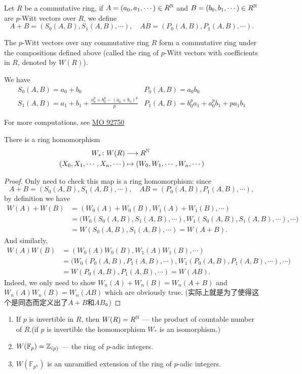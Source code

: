 Let $R$ be a commutative ring, if $A=(a_0,a_1,\cdots)\in R^{\mathbb{N}}$ and $B=(b_0,b_1,\cdots)\in R^{\mathbb{N}}$ are $p$-Witt vectors over $R$, we define
\[A+B=(S_0(A,B),  S_1(A,B),\cdots),\quad AB=(P_0(A,B),  P_1(A,B),\cdots).\]
\begin{theorem}
The $p$-Witt vectors over any commutative ring $R$ form a commutative ring under the compositions defined above (called the ring of $p$-Witt vectors with coefficients in $R$, denoted by $W(R)$).
\end{theorem}
\begin{example}
We have
\[
\begin{array}{cc}
	S_0(A,B) =a_0+b_0	& P_0(A,B)=a_0b_0\\
	S_1(A,B) =a_1+b_1+\frac{a_0^p+b_0^p-(a_0+b_0)^p}{p}	& P_1(A,B)=b_0^pa_1+a_0^pb_1+pa_1b_1
	\end{array}
\]

For more computations, see \href{http://mathoverflow.net/questions/92750/polynomials-for-addition-in-the-witt-vectors/93047#93047}{MO 92750}
\end{example}
\begin{theorem}
There is a ring homomorphism
\begin{align*}
W_*\colon W(R) &\longrightarrow R^{\mathbb{N}} \\
(X_0,X_1,\cdots,X_n,\cdots)&  \mapsto (W_0,W_1,\cdots,W_n,\cdots)
\end{align*}
\end{theorem}
\begin{proof}
Only need to check this map is a ring homomorphism: since
\[A+B=(S_0(A,B),S_1(A,B),\cdots ),\quad AB=(P_0(A,B),P_1(A,B),\cdots ),\]
by definition we have
\begin{align*}
W(A)+W(B)&=(W_0(A)+W_0(B),W_1(A)+W_1(B),\cdots)\\
&=\big(W_0(S_0(A,B),S_1(A,B),\cdots ),W_1(S_0(A,B),S_1(A,B),\cdots ),\cdots\big)\\
&=W(S_0(A,B),S_1(A,B),\cdots )=W(A+B).
\end{align*}
And similarly,
\begin{align*}
W(A)W(B)&=(W_0(A)W_0(B),W_1(A)W_1(B),\cdots)\\
& =\big(W_0(P_0(A,B),P_1(A,B),\cdots ),W_1(P_0(A,B),P_1(A,B),\cdots ),\cdots\big)\\
& =W(P_0(A,B),P_1(A,B),\cdots )=W(AB).
\end{align*}
Indeed, we only need to show $W_n(A)+W_n(B)=W_n(A+B)$ and $W_n(A)W_n(B)=W_n(AB)$ which are obviously true. (实际上就是为了使得这个是同态而定义出了$A+B$和$AB$。)
\end{proof}
\begin{example}
	\begin{enumerate}
		\item If $p$ is invertible in $R$, then $W(R)=R^{\mathbb{N}}$ --- the product of countable number of $R$.(if $p$ is invertible the homomorphism $W_*$ is an
isomorphism.)
		\item $W(\mathbb{F}_p)=\mathbb{Z}_{(p)}$ --- the ring of $p$-adic integers.
		\item $W(\mathbb{F}_{p^n})$ is an unramified extension of the ring of $p$-adic integers.
	\end{enumerate}
\end{example}

